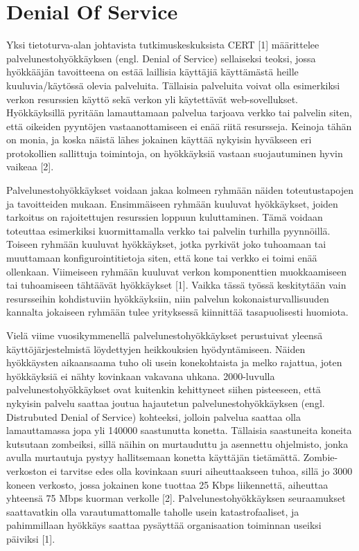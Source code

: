 \section{Denial Of Service}

Yksi tietoturva-alan johtavista tutkimuskeskuksista CERT [1]
määrittelee palvelunestohyökkäyksen (engl. Denial of Service)
sellaiseksi teoksi, jossa hyökkääjän tavoitteena on estää laillisia
käyttäjiä käyttämästä heille kuuluvia/käytössä olevia
palveluita. Tällaisia palveluita voivat olla esimerkiksi verkon
resurssien käyttö sekä verkon yli käytettävät
web-sovellukset. Hyökkäyksillä pyritään lamauttamaan palvelua tarjoava
verkko tai palvelin siten, että oikeiden pyyntöjen vastaanottamiseen
ei enää riitä resursseja. Keinoja tähän on monia, ja koska näistä
lähes jokainen käyttää nykyisin hyväkseen eri protokollien sallittuja
toimintoja, on hyökkäyksiä vastaan suojautuminen hyvin vaikeaa [2].

Palvelunestohyökkäykset voidaan jakaa kolmeen ryhmään näiden
toteutustapojen ja tavoitteiden mukaan. Ensimmäiseen ryhmään kuuluvat
hyökkäykset, joiden tarkoitus on rajoitettujen resurssien loppuun
kuluttaminen. Tämä voidaan toteuttaa esimerkiksi kuormittamalla verkko
tai palvelin turhilla pyynnöillä. Toiseen ryhmään kuuluvat
hyökkäykset, jotka pyrkivät joko tuhoamaan tai muuttamaan
konfigurointitietoja siten, että kone tai verkko ei toimi enää
ollenkaan. Viimeiseen ryhmään kuuluvat verkon komponenttien
muokkaamiseen tai tuhoamiseen tähtäävät hyökkäykset [1]. Vaikka tässä
työssä keskitytään vain resursseihin kohdistuviin hyökkäyksiin, niin
palvelun kokonaisturvallisuuden kannalta jokaiseen ryhmään tulee
yrityksessä kiinnittää tasapuolisesti huomiota.

Vielä viime vuosikymmenellä palvelunestohyökkäykset perustuivat
yleensä käyttöjärjestelmistä löydettyjen heikkouksien
hyödyntämiseen. Näiden hyökkäysten aikaansaama tuho oli usein
konekohtaista ja melko rajattua, joten hyökkäyksiä ei nähty kovinkaan
vakavana uhkana. 2000-luvulla palvelunestohyökkäykset ovat kuitenkin
kehittyneet siihen pisteeseen, että nykyisin palvelu saattaa joutua
hajautetun palvelunestohyökkäyksen (engl. Distrubuted Denial of
Service) kohteeksi, jolloin palvelua saattaa olla lamauttamassa jopa
yli 140000 saastunutta konetta. Tällaisia saastuneita koneita
kutsutaan zombeiksi, sillä näihin on murtauduttu ja asennettu
ohjelmisto, jonka avulla murtautuja pystyy hallitsemaan konetta
käyttäjän tietämättä. Zombie-verkoston ei tarvitse edes olla kovinkaan
suuri aiheuttaakseen tuhoa, sillä jo 3000 koneen verkosto, jossa
jokainen kone tuottaa 25 Kbps liikennettä, aiheuttaa yhteensä 75 Mbps
kuorman verkolle [2]. Palvelunestohyökkäyksen seuraamukset
saattavatkin olla varautumattomalle taholle usein katastrofaaliset, ja
pahimmillaan hyökkäys saattaa pysäyttää organisaation toiminnan
useiksi päiviksi [1].

